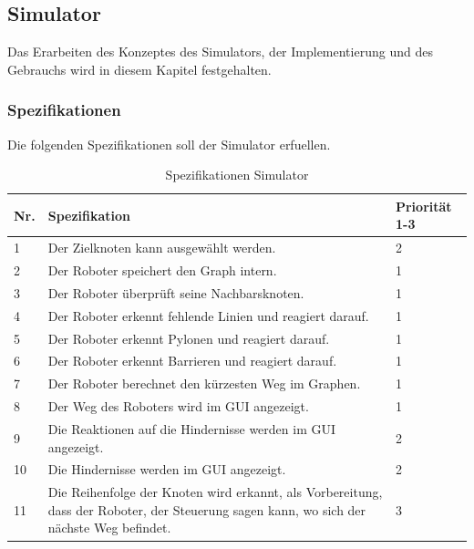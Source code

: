 \subsection{Simulator}

Das Erarbeiten des Konzeptes des Simulators, der Implementierung und des Gebrauchs wird in diesem Kapitel festgehalten.




\subsubsection{Spezifikationen}

Die folgenden Spezifikationen soll der Simulator erfuellen.

\begin{table}[H]
\centering
\small
\begin{tabularx}{\textwidth}{|l|X|l|}
\hline
  \textbf{Nr.} & \textbf{Spezifikation} & \textbf{Priorität 1-3}  \\
  \hline
  1  & Der Zielknoten kann ausgewählt werden. &  2\\
  \hline
   2   & Der Roboter speichert den Graph intern.  & 1\\
  \hline
   3 & Der Roboter überprüft seine Nachbarsknoten.&1\\
  \hline
  4 & Der Roboter erkennt fehlende Linien und reagiert darauf. & 1\\
  \hline
  5 &   Der Roboter erkennt Pylonen und reagiert darauf. & 1\\
  \hline
   6  &   Der Roboter erkennt Barrieren und reagiert darauf. & 1\\
  \hline
    7 &   Der Roboter berechnet den kürzesten Weg im Graphen.& 1\\
  \hline
     8  &   Der Weg des Roboters wird im GUI angezeigt. & 1\\
  \hline
      9   &   Die Reaktionen auf die Hindernisse werden im GUI angezeigt. & 2\\
  \hline
 10   &   Die Hindernisse werden im GUI angezeigt. & 2\\
  \hline
   11   &   Die Reihenfolge der Knoten wird erkannt, als Vorbereitung, dass der Roboter, der Steuerung sagen kann, wo sich der nächste Weg befindet. & 3\\
  \hline

\end{tabularx}
\caption{Spezifikationen Simulator}
\label{table:spezifikation-simulator}
\end{table}

